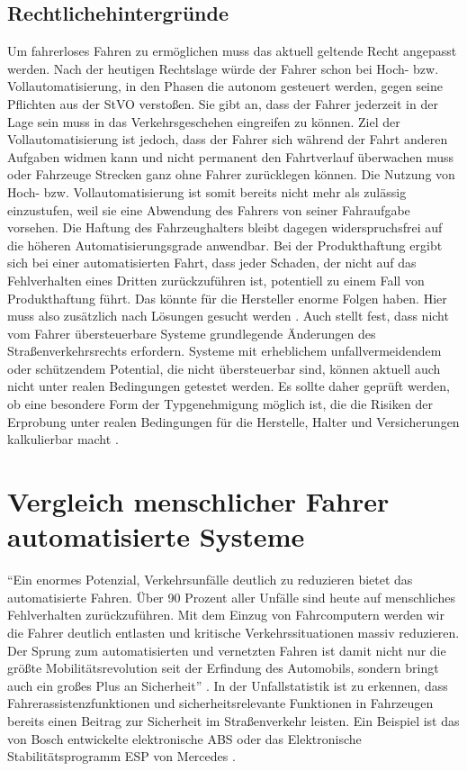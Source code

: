 \subsection{Rechtlichehintergründe}
Um fahrerloses Fahren zu ermöglichen muss das aktuell geltende Recht angepasst werden. Nach der heutigen Rechtslage würde der Fahrer schon bei Hoch- bzw. Vollautomatisierung, in den Phasen die autonom gesteuert werden, gegen seine Pflichten aus der StVO verstoßen. Sie gibt an, dass der Fahrer jederzeit in der Lage sein muss in das Verkehrsgeschehen eingreifen zu können. Ziel der Vollautomatisierung ist jedoch, dass der Fahrer sich während der Fahrt anderen Aufgaben widmen kann und nicht permanent den Fahrtverlauf überwachen muss oder Fahrzeuge Strecken ganz ohne Fahrer zurücklegen können. Die Nutzung von Hoch- bzw. Vollautomatisierung ist somit bereits nicht mehr als zulässig einzustufen, weil sie eine Abwendung des Fahrers von seiner Fahraufgabe vorsehen. Die Haftung des Fahrzeughalters bleibt dagegen widerspruchsfrei auf die höheren Automatisierungsgrade anwendbar. Bei der Produkthaftung ergibt sich bei einer automatisierten Fahrt, dass jeder Schaden, der nicht auf das Fehlverhalten eines Dritten zurückzuführen ist, potentiell zu einem Fall von Produkthaftung führt. Das könnte für die Hersteller enorme Folgen haben. Hier muss also zusätzlich nach Lösungen gesucht werden \parencite[S. 6f]{Gasser.2011}. Auch \Textcite[S. 8]{Mages.2008} stellt fest, dass nicht vom Fahrer übersteuerbare Systeme grundlegende Änderungen des Straßenverkehrsrechts erfordern. Systeme mit erheblichem unfallvermeidendem oder schützendem Potential, die nicht übersteuerbar sind, können aktuell auch nicht unter realen Bedingungen getestet werden. Es sollte daher geprüft werden, ob eine besondere Form der Typgenehmigung möglich ist, die die Risiken der Erprobung unter realen Bedingungen für die Herstelle, Halter und Versicherungen kalkulierbar macht \parencite[S. 89]{WissenschaflicherBeiratbeimBundesministerfurVerkehrBauundStadtentwicklung.2011}. 

\section{Vergleich menschlicher Fahrer automatisierte Systeme}\label{section:Vergleich menschlicher Fahrer automatisierte Systeme}
\enquote{Ein enormes Potenzial, Verkehrsunfälle deutlich zu reduzieren bietet das automatisierte Fahren. Über 90 Prozent aller Unfälle sind heute auf menschliches Fehlverhalten zurückzuführen. Mit dem Einzug von Fahrcomputern werden wir die Fahrer deutlich entlasten und kritische Verkehrssituationen massiv reduzieren. Der Sprung zum automatisierten und vernetzten Fahren ist damit nicht nur die größte Mobilitätsrevolution seit der Erfindung des Automobils, sondern bringt auch ein großes Plus an Sicherheit} \parencite[S. 4]{DEKRA.2017}. In der Unfallstatistik ist zu erkennen, dass Fahrerassistenzfunktionen und sicherheitsrelevante Funktionen in Fahrzeugen bereits einen Beitrag zur Sicherheit im Straßenverkehr leisten. Ein Beispiel ist das von Bosch entwickelte elektronische \ac{ABS} oder das Elektronische Stabilitätsprogramm \acs{ESP} von Mercedes \parencite[S. 4]{Hillenbrand.2012}.

